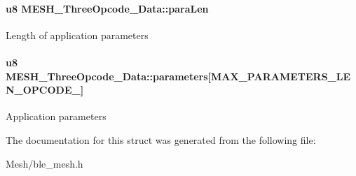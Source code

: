 \paragraph[{\texorpdfstring{para\+Len}{paraLen}}]{\setlength{\rightskip}{0pt plus 5cm}u8 M\+E\+S\+H\+\_\+\+Three\+Opcode\+\_\+\+Data\+::para\+Len}\hypertarget{struct_m_e_s_h___three_opcode___data_a4b59aca4cd6ecc80eb52019403270a56}{}\label{struct_m_e_s_h___three_opcode___data_a4b59aca4cd6ecc80eb52019403270a56}
Length of application parameters 
\paragraph[{\texorpdfstring{parameters}{parameters}}]{\setlength{\rightskip}{0pt plus 5cm}u8 M\+E\+S\+H\+\_\+\+Three\+Opcode\+\_\+\+Data\+::parameters\mbox{[}{\bf M\+A\+X\+\_\+\+P\+A\+R\+A\+M\+E\+T\+E\+R\+S\+\_\+\+L\+E\+N\+\_\+\+O\+P\+C\+O\+D\+E\+\_}\mbox{]}}\hypertarget{struct_m_e_s_h___three_opcode___data_aad81dadfbfec21b76fc328fcbf15a2cc}{}\label{struct_m_e_s_h___three_opcode___data_aad81dadfbfec21b76fc328fcbf15a2cc}
Application parameters 

The documentation for this struct was generated from the following file\+:\begin{DoxyCompactItemize}
\item 
Mesh/ble\+\_\+mesh.\+h\end{DoxyCompactItemize}
